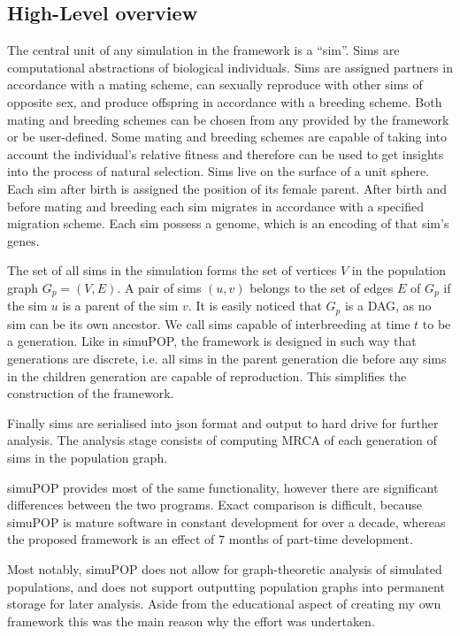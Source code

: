 \documentclass{l4proj}
\begin{document}
\subsection{High-Level overview}
The central unit of any simulation in the framework is a ``sim''. Sims are computational abstractions of biological individuals. Sims are assigned partners in accordance with a mating scheme, can sexually reproduce with other sims of opposite sex, and produce offspring in accordance with a breeding scheme. Both mating and breeding schemes can be chosen from any provided by the framework or be user-defined. Some mating and breeding schemes are capable of taking into account the individual's relative fitness and therefore can be used to get insights into the process of natural selection. Sims live on the surface of a unit sphere. Each sim after birth is assigned the position of its female parent. After birth and before mating and breeding each sim migrates in accordance with a specified migration scheme. Each sim possess a genome, which is an encoding of that sim's genes.

The set of all sims in the simulation forms the set of vertices $V$ in the \gls{population graph} $G_{p} = (V, E)$. A pair of sims $(u, v)$ belongs to the set of edges $E$ of $G_{p}$ if the sim $u$ is a parent of the sim $v$. It is easily noticed that $G_{p}$ is a DAG, as no sim can be its own ancestor. We call sims capable of interbreeding at time $t$ to be a generation. Like in simuPOP, the framework is designed in such way that generations are discrete, i.e. all sims in the parent generation die before any sims in the children generation are capable of reproduction. This simplifies the construction of the framework.

Finally sims are serialised into json format and output to hard drive for further analysis. The analysis stage consists of computing MRCA of each generation of sims in the population graph.

simuPOP provides most of the same functionality, however there are significant differences between the two programs. Exact comparison is difficult, because simuPOP is mature software in constant development for over a decade, whereas the proposed framework is an effect of 7 months of part-time development.

Most notably, simuPOP does not allow for graph-theoretic analysis of simulated populations, and does not support outputting population graphs into permanent storage for later analysis. Aside from the educational aspect of creating my own framework this was the main reason why the effort was undertaken.
\end{document}
